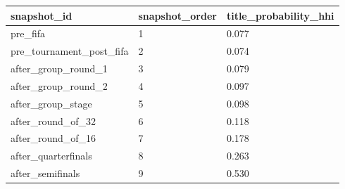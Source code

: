 \begin{tabular}{lll}
\toprule
snapshot\_id & snapshot\_order & title\_probability\_hhi \\
\midrule
pre\_fifa & 1 & 0.077 \\
pre\_tournament\_post\_fifa & 2 & 0.074 \\
after\_group\_round\_1 & 3 & 0.079 \\
after\_group\_round\_2 & 4 & 0.097 \\
after\_group\_stage & 5 & 0.098 \\
after\_round\_of\_32 & 6 & 0.118 \\
after\_round\_of\_16 & 7 & 0.178 \\
after\_quarterfinals & 8 & 0.263 \\
after\_semifinals & 9 & 0.530 \\
\bottomrule
\end{tabular}
